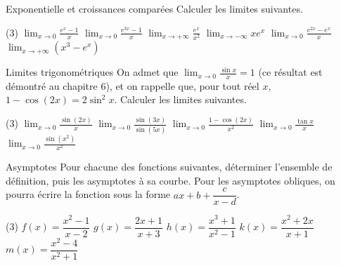 \begin{exercice}[2]{Exponentielle et croissances comparées}
Calculer les limites suivantes.
\begin{tasks}(3)
  \task $\displaystyle\lim_{x\to0}\frac{e^{x}-1}{x}$
  \task $\displaystyle\lim_{x\to0}\frac{e^{3x}-1}{x}$
  \task $\displaystyle\lim_{x\to+\infty}\frac{e^{x}}{x^{2}}$
  \task $\displaystyle\lim_{x\to-\infty}xe^{x}$
  \task $\displaystyle\lim_{x\to0}\frac{e^{2x}-e^{x}}{x}$
  \task $\displaystyle\lim_{x\to+\infty}\left(x^{3}-e^{x}\right)$
\end{tasks}
\end{exercice}

\begin{exercice}[2]{Limites trigonométriques}
On admet que $\displaystyle\lim_{x\to0}\frac{\sin x}{x}=1$ (ce résultat est démontré au chapitre 6), et on rappelle
que, pour tout réel $x$, $1-\cos(2x)=2\sin^{2}x$. Calculer les limites suivantes.
\begin{tasks}(3)
  \task $\displaystyle\lim_{x\to0}\frac{\sin(2x)}{x}$
  \task $\displaystyle\lim_{x\to0}\frac{\sin(3x)}{\sin(5x)}$
  \task $\displaystyle\lim_{x\to0}\frac{1-\cos(2x)}{x^{2}}$
  \task $\displaystyle\lim_{x\to0}\frac{\tan x}{x}$
  \task $\displaystyle\lim_{x\to0}\frac{\sin(x^{2})}{x^{2}}$
\end{tasks}
\end{exercice}

\begin{exercice}[2]{Asymptotes}
Pour chacune des fonctions suivantes, déterminer l'ensemble de définition, puis les asymptotes à sa courbe.
Pour les asymptotes obliques, on pourra écrire la fonction sous la forme $ax+b+\dfrac{c}{x-d}$.
\begin{tasks}(3)
  \task $f(x)=\dfrac{x^{2}-1}{x-2}$
  \task $g(x)=\dfrac{2x+1}{x+3}$
  \task $h(x)=\dfrac{x^{3}+1}{x^{2}-1}$
  \task $k(x)=\dfrac{x^{2}+2x}{x+1}$
  \task $m(x)=\dfrac{x^{2}-4}{x^{2}+1}$
\end{tasks}
\end{exercice}


